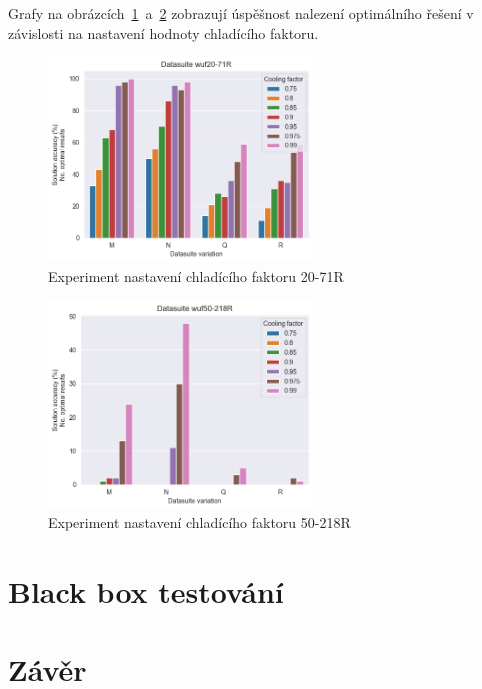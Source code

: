 \documentclass[twoside,twocolumn]{article}
\begin{document}
    Grafy na obrázcích~\ref{fig:cooling_factor_71}~a~\ref{fig:cooling_factor_218R} zobrazují úspěšnost nalezení
    optimálního řešení v závislosti na nastavení hodnoty chladícího faktoru.

    \begin{figure}
        \centering
        \includegraphics[width=7cm]{images/testing/cooling_factor/wuf20-71R}
        \caption{Experiment nastavení chladícího faktoru 20-71R}
        \label{fig:cooling_factor_71}
    \end{figure}

    \begin{figure}
        \centering
        \includegraphics[width=7cm]{images/testing/cooling_factor/wuf50-218R}
        \caption{Experiment nastavení chladícího faktoru 50-218R}
        \label{fig:cooling_factor_218R}
    \end{figure}



    \section{Black box testování}



    \section{Závěr}
\end{document}
